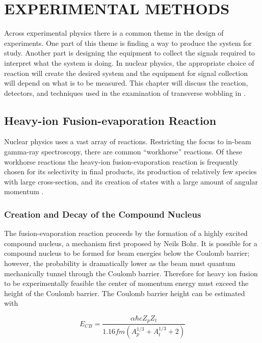 %
%

\chapter{EXPERIMENTAL METHODS}
\label{chp:exp-pr}
Across experimental physics there is a common theme in the design of experiments. One part of this theme is finding a way to produce the system for study. Another part is designing the equipment to collect the signals required to interpret what the system is doing. In nuclear physics, the appropriate choice of reaction will create the desired system and the equipment for signal collection will depend on what is to be measured. This chapter will discuss the reaction, detectors, and techniques used in the examination of transverse wobbling in \pr{}.
\section{Heavy-ion Fusion-evaporation Reaction}
\label{sec:exp-pr-fus-evap}
Nuclear physics uses a vast array of reactions. Restricting the focus to in-beam gamma-ray spectroscopy, there are common ``workhorse'' reactions. Of these workhorse reactions the heavy-ion fusion-evaporation reaction is frequently chosen for its selectivity in final products, its production of relatively few species with large cross-section, and its creation of states with a large amount of angular momentum \cite{beausang1996arrays}.
\subsection{Creation and Decay of the Compound Nucleus}
\label{ssec:exp-pr-fus-evap-cn}
The fusion-evaporation reaction proceeds by the formation of a highly excited compound nucleus, a mechanism first proposed by Neils Bohr\cite{bohr1936neutron}. It is possible for a compound nucleus to be formed for beam energies below the Coulomb barrier; however, the probability is dramatically lower as the beam must quantum mechanically tunnel through the Coulomb barrier. Therefore for heavy ion fusion to be experimentally feasible the center of momentum energy must exceed the height of the Coulomb barrier. The Coulomb barrier height can be estimated with

\begin{equation}
\label{eqn:chp3-cb_en}
E_{CB}=\frac{\alpha \hbar c Z_p Z_t}{1.16 fm (A_p^{1/3} + A_t^{1/3} + 2)}
\end{equation}

